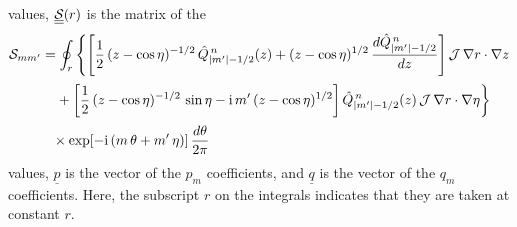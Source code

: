 \documentclass[12pt,prb,aps,notitlepage]{revtex4-1}
\begin{document}
values, 
$\underline{\underline{{\cal S}}}(r)$ is the matrix of the 
\begin{align}
{\cal S}_{mm'} &=\oint_{r}
\left\{\left[\frac{1}{2}\,(z-\cos\eta)^{-1/2}\,\hat{Q}_{|m'|-1/2}^{\,n}(z)+(z-\cos\eta)^{1/2}\,\frac{d\hat{Q}_{|m'|-1/2}^{\,n}}{dz}\right]{\cal J}\,\nabla r\cdot \nabla z
\right.\nonumber\\[0.5ex]&
\left.\phantom{=}+\left[\frac{1}{2}\,(z-\cos\eta)^{-1/2}\,\sin\eta-{\rm i}\,m'\,(z-\cos\eta)^{1/2}\right]\hat{Q}_{|m'|-1/2}^{\,n}(z)\,{\cal J}\,\nabla r\cdot \nabla \eta
\right\}\nonumber\\[0.5ex] &
\phantom{=}\times\exp[-{\rm i}\,(m\,\theta+m'\,\eta)]\,\frac{d\theta}{2\pi}
\end{align}
values, $\underline{p}$ is the vector of the $p_m$ coefficients, and  $\underline{q}$ is the vector of the $q_m$ coefficients. Here, the
subscript $r$ on the integrals indicates that they are taken at constant $r$. 
\end{document}
